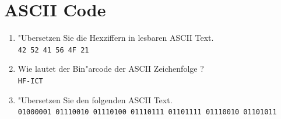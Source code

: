 \documentclass[a4paper,10pt]{article}
\begin{document}
\section{ASCII Code}

\begin{enumerate}
\item "Ubersetzen Sie die Hexziffern in lesbaren ASCII Text.\\
\verb|42 52 41 56 4F 21| %

\item Wie lautet der Bin"arcode der ASCII Zeichenfolge ? \\
\verb|HF-ICT|  %

\item "Ubersetzen Sie den folgenden ASCII Text.\\
\verb|01000001 01110010 01110100 01110111 01101111 01110010 01101011| %
\end{enumerate}
\end{document}
